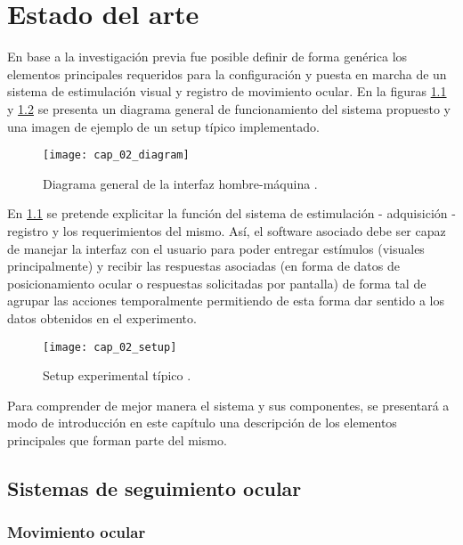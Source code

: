 \documentclass[../main.tex]{subfiles}
\begin{document}
		
\chapter{Estado del arte}
\label{cha:02_estado_del_arte}

	En base a la investigación previa fue posible definir de forma genérica los elementos principales requeridos para la configuración y puesta en marcha de un sistema de estimulación visual y registro de movimiento ocular. En la figuras \ref{fig:02_diagrama_interfaz} y \ref{fig:02_ejemplo_setup} se presenta un diagrama general de funcionamiento del sistema propuesto y una imagen de ejemplo de un \gls{setup} típico implementado.   

	\begin{figure}[H]
		\centering
		\texttt{[image: cap\_02\_diagram]}
		\caption[Diagrama general de la interfaz hombre-máquina]{Diagrama general de la interfaz hombre-máquina \cite{article:baseInfo}.}
		\label{fig:02_diagrama_interfaz}
	\end{figure}

	En \ref{fig:02_diagrama_interfaz} se pretende explicitar la función del sistema de estimulación - adquisición - registro y los requerimientos del mismo. Así, el software asociado debe ser capaz de manejar la interfaz con el usuario para poder entregar estímulos (visuales principalmente) y recibir las respuestas asociadas (en forma de datos de posicionamiento ocular o respuestas solicitadas por pantalla) de forma tal de agrupar las acciones temporalmente permitiendo de esta forma dar sentido a los datos obtenidos en el experimento. 

	\newpage
	\begin{figure}[H]
		\centering
		\texttt{[image: cap\_02\_setup]}
		\caption[Setup experimental típico]{Setup experimental típico \cite{article:baseInfo}.}
		\label{fig:02_ejemplo_setup}
	\end{figure}

	Para comprender de mejor manera el sistema y sus componentes, se presentará a modo de introducción en este capítulo una descripción de los elementos principales que forman parte del mismo. 

	\section{Sistemas de seguimiento ocular}
	\label{sec:02_sistemas_de_seguimiento_ocular}
		\subsection{Movimiento ocular}
		\label{sub:02_movimiento_ocular}
\end{document}
